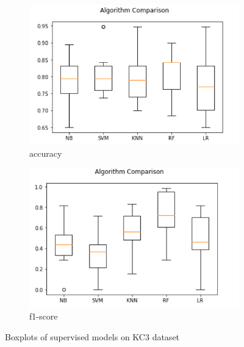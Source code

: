 \begin{figure}[h!]
  \centering
  \begin{subfigure}[b]{0.4\linewidth}
    \includegraphics[width=\linewidth]{report/KC3.png}
    \caption{accuracy}
  \end{subfigure}
  \begin{subfigure}[b]{0.4\linewidth}
    \includegraphics[width=\linewidth]{report/KC3_f.png}
    \caption{f1-score}
  \end{subfigure}
  \caption{Boxplots of supervised models on KC3 dataset}
\end{figure}

\pagebreak

